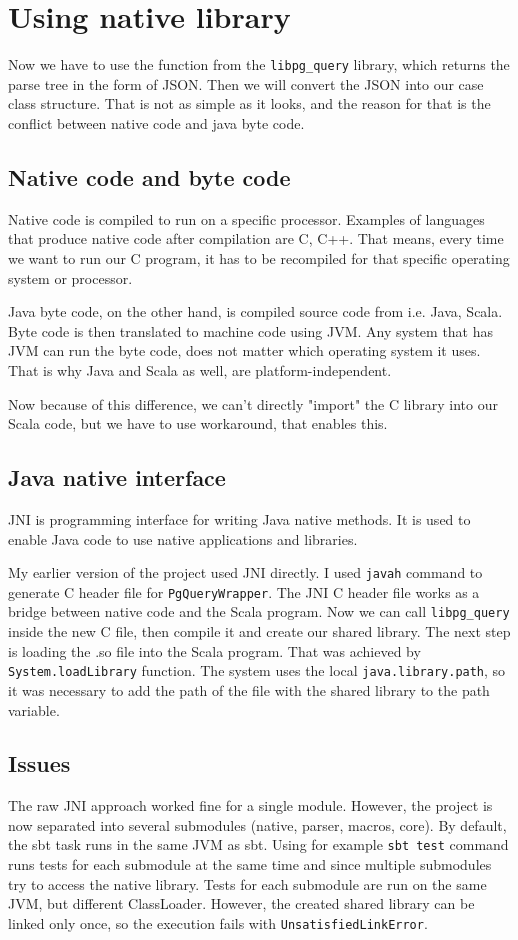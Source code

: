 \section{Using native library}
Now we have to use the function from the \texttt{libpg\_query} library, which returns the parse tree in the form of JSON. Then we will convert the JSON into our case class structure. That is not as simple as it looks, and the reason for that is the conflict between native code and java byte code. 

\subsection{Native code and byte code}
Native code is compiled to run on a specific processor. Examples of languages that produce native code after compilation are C, C++. That means, every time we want to run our C program, it has to be recompiled for that specific operating system or processor.

Java byte code, on the other hand, is compiled source code from i.e. Java, Scala. Byte code is then translated to machine code using JVM. Any system that has JVM can run the byte code, does not matter which operating system it uses. That is why Java and Scala as well, are platform-independent.

Now because of this difference, we can't directly "import" the C library into our Scala code, but we have to use workaround, that enables this.

\subsection{Java native interface}
JNI is programming interface for writing Java native methods.\cite{JNI} It is used to enable Java code to use native applications and libraries. 

My earlier version of the project used JNI directly. I used \texttt{javah} command to generate C header file for \texttt{PgQueryWrapper}. The JNI C header file works as a bridge between native code and the Scala program. Now we can call \texttt{libpg\_query} inside the new C file, then compile it and create our shared library. The next step is loading the .so file into the Scala program. That was achieved by \texttt{System.loadLibrary} function. The system uses the local \texttt{java.library.path}, so it was necessary to add the path of the file with the shared library to the path variable.

\subsection{Issues}
The raw JNI approach worked fine for a single module. However, the project is now separated into several submodules (native, parser, macros, core). By default, the sbt task runs in the same JVM as sbt.\cite{sbt fork} Using for example \texttt{sbt test} command runs tests for each submodule at the same time and since multiple submodules try to access the native library. Tests for each submodule are run on the same JVM, but different ClassLoader. However, the created shared library can be linked only once, so the execution fails with \texttt{UnsatisfiedLinkError}. 

